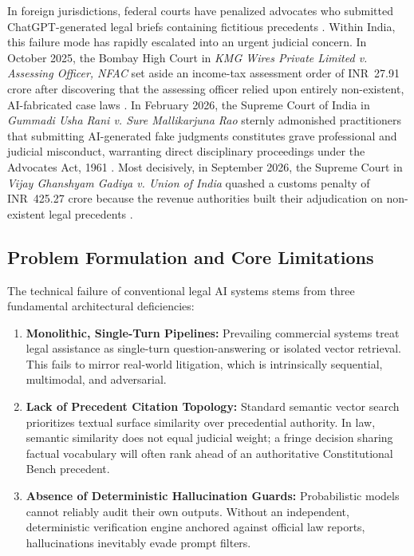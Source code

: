 \documentclass[conference]{IEEEtran}
\begin{document}
In foreign jurisdictions, federal courts have penalized advocates who submitted ChatGPT-generated legal briefs containing fictitious precedents \cite{mata}. Within India, this failure mode has rapidly escalated into an urgent judicial concern. In October 2025, the Bombay High Court in \emph{KMG Wires Private Limited v. Assessing Officer, NFAC} set aside an income-tax assessment order of INR~27.91 crore after discovering that the assessing officer relied upon entirely non-existent, AI-fabricated case laws \cite{kmgwires}. In February 2026, the Supreme Court of India in \emph{Gummadi Usha Rani v. Sure Mallikarjuna Rao} sternly admonished practitioners that submitting AI-generated fake judgments constitutes grave professional and judicial misconduct, warranting direct disciplinary proceedings under the Advocates Act, 1961 \cite{gummadi}. Most decisively, in September 2026, the Supreme Court in \emph{Vijay Ghanshyam Gadiya v. Union of India} quashed a customs penalty of INR~425.27 crore because the revenue authorities built their adjudication on non-existent legal precedents \cite{gadiya}.

\subsection{Problem Formulation and Core Limitations}
The technical failure of conventional legal AI systems stems from three fundamental architectural deficiencies:
\begin{enumerate}
    \item \textbf{Monolithic, Single-Turn Pipelines:} Prevailing commercial systems treat legal assistance as single-turn question-answering or isolated vector retrieval. This fails to mirror real-world litigation, which is intrinsically sequential, multimodal, and adversarial.
    \item \textbf{Lack of Precedent Citation Topology:} Standard semantic vector search prioritizes textual surface similarity over precedential authority. In law, semantic similarity does not equal judicial weight; a fringe decision sharing factual vocabulary will often rank ahead of an authoritative Constitutional Bench precedent.
    \item \textbf{Absence of Deterministic Hallucination Guards:} Probabilistic models cannot reliably audit their own outputs. Without an independent, deterministic verification engine anchored against official law reports, hallucinations inevitably evade prompt filters.
\end{enumerate}
\end{document}
